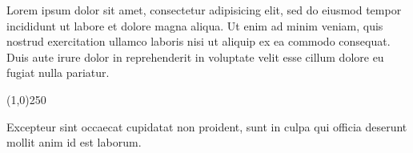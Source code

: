 \begin{acknowledgements}

  Lorem ipsum dolor sit amet, consectetur adipisicing elit, sed do eiusmod tempor incididunt ut labore et dolore magna aliqua. Ut enim ad minim veniam, quis nostrud exercitation ullamco laboris nisi ut aliquip ex ea commodo consequat. Duis aute irure dolor in reprehenderit in voluptate velit esse cillum dolore eu fugiat nulla pariatur.

  \begin{center}
    \line(1,0){250}
  \end{center}

  Excepteur sint occaecat cupidatat non proident, sunt in culpa qui officia deserunt mollit anim id est laborum.

\end{acknowledgements}
